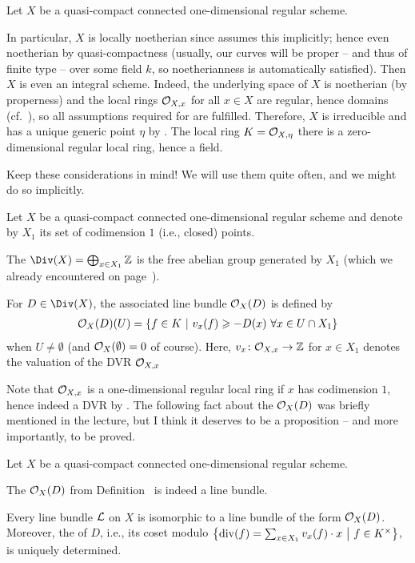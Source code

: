 \documentclass[a4paper,parskip=half,numbers=enddot, DIV=12]{scrreprt}
\renewcommand{\geq}{\geqslant}
\begin{document}
Let $X$ be a quasi-compact connected one-dimensional regular scheme. 
\begin{con}
	In particular, $X$ is locally noetherian since \cite[Definition~2.4.5]{alggeo1} assumes this implicitly; hence even noetherian by quasi-compactness (usually, our curves will be proper -- and thus of finite type -- over some field $k$, so noetherianness is automatically satisfied). Then $X$ is even an integral scheme. Indeed, the underlying space of $X$ is noetherian (by properness) and the local rings $\mathcal{O}_{X,x}$ for all $x\in X$ are regular, hence domains (cf.\ \cite[Corollary~3.4.9]{alg2}), so all assumptions required for \cite[Proposition~2.1.4]{alggeo1} are fulfilled. Therefore, $X$ is irreducible and has a unique generic point $\eta$ by \cite[Fact~2.1.9]{alggeo1}. The local ring $K=\mathcal{O}_{X,\eta}$ there is a zero-dimensional regular local ring, hence a field.
	
	Keep these considerations in mind! We will use them quite often, and we might do so implicitly.
\end{con}
\begin{defi}
	Let $X$ be  a quasi-compact connected one-dimensional regular scheme and denote by $X_1$ its set of codimension $1$ (i.e., closed) points.
	\begin{alphanumerate}
		\item The  $\Div(X)=\bigoplus_{x\in X_1}\IZ$ is the free abelian group generated by $X_1$ (which we already encountered on page~\pageref{par:Divisors}).
		\item For $D\in\Div(X)$, the associated line bundle $\mathcal{O}_X(D)$ is defined by
		\begin{align*}
		\Oo_X(D)(U)=\left\{f\in K\st v_x(f)\geq -D(x)\ \forall x\in U\cap X_1\right\}
		\end{align*}
		when $U\neq \emptyset$ (and $\mathcal{O}_X(\emptyset)=0$ of course). Here, $v_x\colon \Oo_{X,x}\morphism\IZ$ for $x\in X_1$ denotes the valuation of the DVR $\mathcal{O}_{X,x}$
	\end{alphanumerate}
\end{defi}
Note that $\mathcal{O}_{X,x}$ is a one-dimensional regular local ring if $x$ has codimension $1$, hence indeed a DVR by \cite[Theorem~21]{alg2}. The following fact about the $\mathcal{O}_X(D)$ was briefly mentioned in the lecture, but I think it deserves to be a proposition -- and more importantly, to be proved.
\begin{prop}
	Let $X$ be a quasi-compact connected one-dimensional regular scheme.
	\begin{alphanumerate}
		\item The $\mathcal{O}_X(D)$ from Definition~ is indeed a line bundle.
		\item Every line bundle $\mathcal{L}$ on $X$ is isomorphic to a line bundle of the form $\mathcal{O}_X(D)$. Moreover, the  of $D$, i.e., its coset modulo $\left\{\operatorname{div}(f)=\sum_{x\in X_1}v_x(f)\cdot x\ \middle|\  f\in K^\times\right\}$, is uniquely determined. 
	\end{alphanumerate}
\end{prop}
\end{document}
